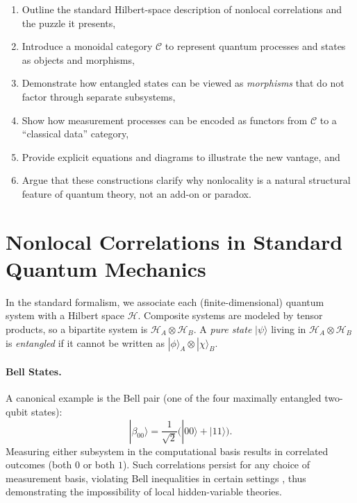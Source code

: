 \documentclass[12pt]{article}
\begin{document}
\begin{enumerate}[label=(\roman*)]
    \item Outline the standard Hilbert-space description of nonlocal correlations and the puzzle it presents,
    \item Introduce a monoidal category $\mathcal{C}$ to represent quantum processes and states as objects and morphisms,
    \item Demonstrate how entangled states can be viewed as \emph{morphisms} that do not factor through separate subsystems,
    \item Show how measurement processes can be encoded as functors from $\mathcal{C}$ to a ``classical data'' category,
    \item Provide explicit equations and diagrams to illustrate the new vantage, and
    \item Argue that these constructions clarify why nonlocality is a natural structural feature of quantum theory, not an add-on or paradox.
\end{enumerate}

\vspace{1em}

\section{Nonlocal Correlations in Standard Quantum Mechanics}
\label{sec:standardQM}

In the standard formalism, we associate each (finite-dimensional) quantum system with a Hilbert space $\mathcal{H}$. Composite systems are modeled by tensor products, so a bipartite system is $\mathcal{H}_A \otimes \mathcal{H}_B$. A \emph{pure state} $|\psi\rangle$ living in $\mathcal{H}_A \otimes \mathcal{H}_B$ is \emph{entangled} if it cannot be written as $|\phi\rangle_A \otimes |\chi\rangle_B$.

\paragraph{Bell States.}
A canonical example is the Bell pair (one of the four maximally entangled two-qubit states):
\begin{equation}\label{eq:bell}
|\beta_{00}\rangle = \frac{1}{\sqrt{2}}\bigl(|00\rangle + |11\rangle\bigr).
\end{equation}
Measuring either subsystem in the computational basis results in correlated outcomes (both $0$ or both $1$). Such correlations persist for any choice of measurement basis, violating Bell inequalities in certain settings \cite{Clauser1969}, thus demonstrating the impossibility of local hidden-variable theories.
\end{document}
